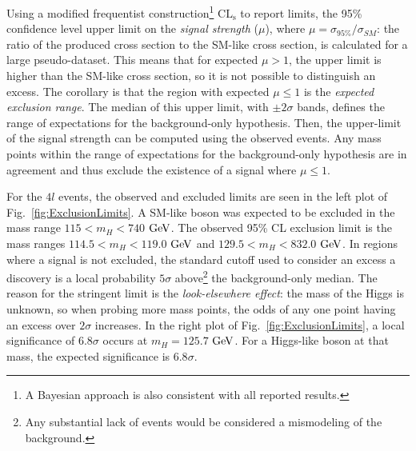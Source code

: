 Using a modified frequentist construction\footnote{A Bayesian approach \cite{} is also consistent with all reported results.} $\mathrm{CL_s}$ \cite{} to report limits, the 95\% confidence level upper limit on the \textit{signal strength} ($\mu$), where $\mu=\sigma_{95\%}/\sigma_{SM}$: the ratio of the produced cross section to the SM-like cross section, is calculated for a large pseudo-dataset. This means that for expected $\mu>1$, the upper limit is higher than the SM-like cross section, so it is not possible to distinguish an excess. The corollary is that the region with expected $\mu\leq1$ is the \textit{expected exclusion range}. The median of this upper limit, with $\pm2\sigma$ bands, defines the range of expectations for the background-only hypothesis. Then, the upper-limit of the signal strength can be computed using the observed events. Any mass points within the range of expectations for the background-only hypothesis are in agreement and thus exclude the existence of a signal where $\mu\leq1$.

For the $4l$ events, the observed and excluded limits are seen in the left plot of Fig.~\ref{fig:ExclusionLimits}. A SM-like boson was expected to be excluded in the mass range $115< m_H <740$ $\rm{GeV}$. The observed 95\% CL exclusion limit is the mass ranges $114.5<m_H<119.0$ $\rm{GeV}$ and $129.5<m_H<832.0$ $\rm{GeV}$. In regions where a signal is not excluded, the standard cutoff used to consider an excess a discovery is a local probability $5\sigma$ above\footnote{Any substantial lack of events would be considered a mismodeling of the background.} the background-only median. The reason for the stringent limit is the \textit{look-elsewhere effect}: the mass of the Higgs is unknown, so when probing more mass points, the odds of any one point having an excess over $2\sigma$ increases. In the right plot of Fig.~\ref{fig:ExclusionLimits}, a local significance of $6.8\sigma$ occurs at $m_H=125.7$ $\rm{GeV}$. For a Higgs-like boson at that mass, the expected significance is $6.8\sigma$.

